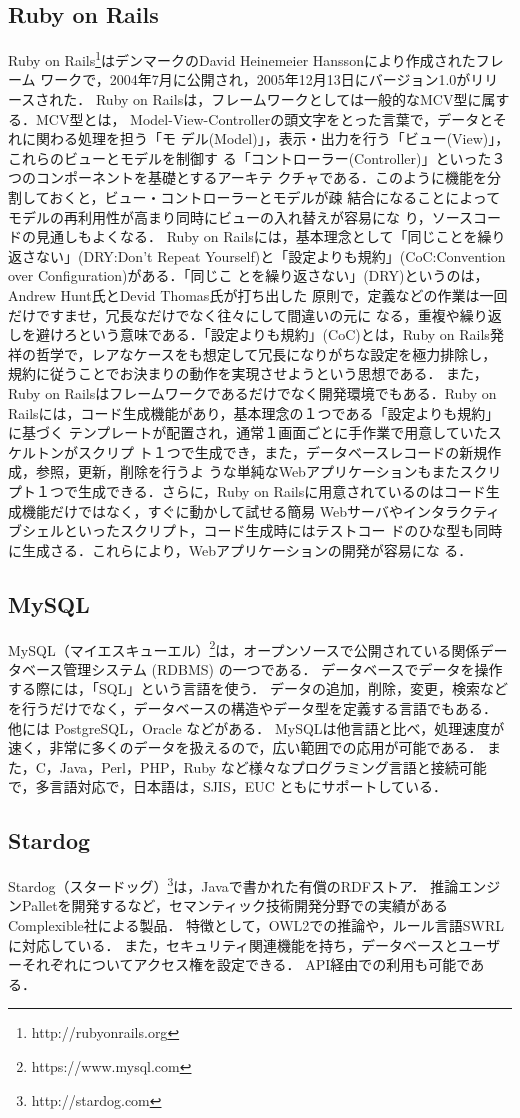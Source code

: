 \subsection{Ruby on Rails}
Ruby on Rails\footnote{http://rubyonrails.org}はデンマークのDavid Heinemeier Hanssonにより作成されたフレーム
ワークで，2004年7月に公開され，2005年12月13日にバージョン1.0がリリースされた．
Ruby on Railsは，フレームワークとしては一般的なMCV型に属する．MCV型とは，
Model-View-Controllerの頭文字をとった言葉で，データとそれに関わる処理を担う「モ
デル(Model)」，表示・出力を行う「ビュー(View)」，これらのビューとモデルを制御す
る「コントローラー(Controller)」といった３つのコンポーネントを基礎とするアーキテ
クチャである．このように機能を分割しておくと，ビュー・コントローラーとモデルが疎
結合になることによってモデルの再利用性が高まり同時にビューの入れ替えが容易にな
り，ソースコードの見通しもよくなる．
Ruby on Railsには，基本理念として「同じことを繰り返さない」(DRY:Don't Repeat
Yourself)と「設定よりも規約」(CoC:Convention over Configuration)がある．「同じこ
とを繰り返さない」(DRY)というのは，Andrew Hunt氏とDevid Thomas氏が打ち出した
原則で，定義などの作業は一回だけですませ，冗長なだけでなく往々にして間違いの元に
なる，重複や繰り返しを避けろという意味である．「設定よりも規約」(CoC)とは，Ruby
on Rails発祥の哲学で，レアなケースをも想定して冗長になりがちな設定を極力排除し，
規約に従うことでお決まりの動作を実現させようという思想である．
また，Ruby on Railsはフレームワークであるだけでなく開発環境でもある．Ruby on
Railsには，コード生成機能があり，基本理念の１つである「設定よりも規約」に基づく
テンプレートが配置され，通常１画面ごとに手作業で用意していたスケルトンがスクリプ
ト１つで生成でき，また，データベースレコードの新規作成，参照，更新，削除を行うよ
うな単純なWebアプリケーションもまたスクリプト１つで生成できる．さらに，Ruby on
Railsに用意されているのはコード生成機能だけではなく，すぐに動かして試せる簡易
Webサーバやインタラクティブシェルといったスクリプト，コード生成時にはテストコー
ドのひな型も同時に生成さる．これらにより，Webアプリケーションの開発が容易にな
る．

\subsection{MySQL}
MySQL（マイエスキューエル）\footnote{https://www.mysql.com}は，オープンソースで公開されている関係データベース管理システム (RDBMS) の一つである．
データベースでデータを操作する際には，「SQL」という言語を使う．
データの追加，削除，変更，検索などを行うだけでなく，データベースの構造やデータ型を定義する言語でもある．
他には PostgreSQL，Oracle などがある．
MySQLは他言語と比べ，処理速度が速く，非常に多くのデータを扱えるので，広い範囲での応用が可能である．
また，C，Java，Perl，PHP，Ruby など様々なプログラミング言語と接続可能で，多言語対応で，日本語は，SJIS，EUC ともにサポートしている．

\subsection{Stardog}
Stardog（スタードッグ）\footnote{http://stardog.com}は，Javaで書かれた有償のRDFストア．
推論エンジンPalletを開発するなど，セマンティック技術開発分野での実績があるComplexible社による製品．
特徴として，OWL2での推論や，ルール言語SWRLに対応している．
また，セキュリティ関連機能を持ち，データベースとユーザーそれぞれについてアクセス権を設定できる．
API経由での利用も可能である．
